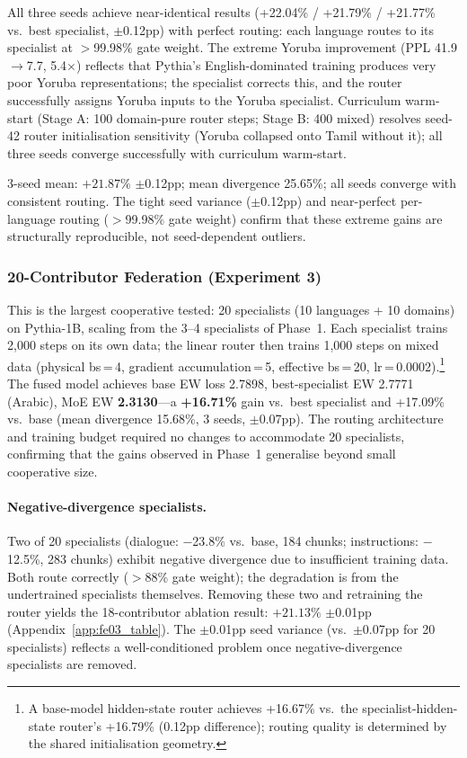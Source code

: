 \documentclass{article}
\begin{document}
All three seeds achieve near-identical results (+22.04\% / +21.79\% / +21.77\% vs.\ best specialist, $\pm$0.12pp) with perfect routing: each language routes to its specialist at $>$99.98\% gate weight. The extreme Yoruba improvement (PPL 41.9$\to$7.7, 5.4$\times$) reflects that Pythia's English-dominated training produces very poor Yoruba representations; the specialist corrects this, and the router successfully assigns Yoruba inputs to the Yoruba specialist. Curriculum warm-start (Stage A: 100 domain-pure router steps; Stage B: 400 mixed) resolves seed-42 router initialisation sensitivity (Yoruba collapsed onto Tamil without it); all three seeds converge successfully with curriculum warm-start.

3-seed mean: $+21.87\%$ $\pm$0.12pp; mean divergence 25.65\%; all seeds converge with consistent routing. The tight seed variance ($\pm$0.12pp) and near-perfect per-language routing ($>$99.98\% gate weight) confirm that these extreme gains are structurally reproducible, not seed-dependent outliers.

\subsubsection{20-Contributor Federation (Experiment 3)}
\label{sec:phase2_twenty}

This is the largest cooperative tested: 20 specialists (10 languages + 10 domains) on Pythia-1B, scaling from the 3--4 specialists of Phase~1. Each specialist trains 2,000 steps on its own data; the linear router then trains 1,000 steps on mixed data (physical bs\,=\,4, gradient accumulation\,=\,5, effective bs\,=\,20, lr\,=\,0.0002).\footnote{A base-model hidden-state router achieves +16.67\% vs.\ the specialist-hidden-state router's +16.79\% (0.12pp difference); routing quality is determined by the shared initialisation geometry.} The fused model achieves base EW loss 2.7898, best-specialist EW 2.7771 (Arabic), MoE EW \textbf{2.3130}---a \textbf{+16.71\%} gain vs.\ best specialist and +17.09\% vs.\ base (mean divergence 15.68\%, 3 seeds, $\pm$0.07pp). The routing architecture and training budget required no changes to accommodate 20 specialists, confirming that the gains observed in Phase~1 generalise beyond small cooperative size.

\paragraph{Negative-divergence specialists.} Two of 20 specialists (dialogue: $-$23.8\% vs.\ base, 184 chunks; instructions: $-$12.5\%, 283 chunks) exhibit negative divergence due to insufficient training data. Both route correctly ($>$88\% gate weight); the degradation is from the undertrained specialists themselves. Removing these two and retraining the router yields the 18-contributor ablation result: $+21.13\%$ $\pm$0.01pp (Appendix~\ref{app:fe03_table}). The $\pm$0.01pp seed variance (vs.\ $\pm$0.07pp for 20 specialists) reflects a well-conditioned problem once negative-divergence specialists are removed.
\end{document}
